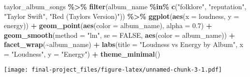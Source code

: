 \documentclass[
]{article}
\newenvironment{Shaded}{\begin{snugshade}}{\end{snugshade}}
\newcommand{\AttributeTok}[1]{\textcolor[rgb]{0.13,0.29,0.53}{#1}}
\newcommand{\CommentTok}[1]{\textcolor[rgb]{0.56,0.35,0.01}{\textit{#1}}}
\newcommand{\ConstantTok}[1]{\textcolor[rgb]{0.56,0.35,0.01}{#1}}
\newcommand{\DecValTok}[1]{\textcolor[rgb]{0.00,0.00,0.81}{#1}}
\newcommand{\FloatTok}[1]{\textcolor[rgb]{0.00,0.00,0.81}{#1}}
\newcommand{\FunctionTok}[1]{\textcolor[rgb]{0.13,0.29,0.53}{\textbf{#1}}}
\newcommand{\NormalTok}[1]{#1}
\newcommand{\OtherTok}[1]{\textcolor[rgb]{0.56,0.35,0.01}{#1}}
\newcommand{\SpecialCharTok}[1]{\textcolor[rgb]{0.81,0.36,0.00}{\textbf{#1}}}
\newcommand{\StringTok}[1]{\textcolor[rgb]{0.31,0.60,0.02}{#1}}
\begin{document}
\begin{Shaded}
\begin{Highlighting}[]
\NormalTok{taylor\_album\_songs }\SpecialCharTok{\%\textgreater{}\%}
  \FunctionTok{filter}\NormalTok{(album\_name }\SpecialCharTok{\%in\%} \FunctionTok{c}\NormalTok{(}\StringTok{"folklore"}\NormalTok{, }\StringTok{"reputation"}\NormalTok{, }\StringTok{"Taylor Swift"}\NormalTok{, }\StringTok{"Red (Taylor\textquotesingle{}s Version)"}\NormalTok{)) }\SpecialCharTok{\%\textgreater{}\%}
  \FunctionTok{ggplot}\NormalTok{(}\FunctionTok{aes}\NormalTok{(}\AttributeTok{x =}\NormalTok{ loudness, }\AttributeTok{y =}\NormalTok{ energy)) }\SpecialCharTok{+}
    \FunctionTok{geom\_point}\NormalTok{(}\FunctionTok{aes}\NormalTok{(}\AttributeTok{color =}\NormalTok{ album\_name), }\AttributeTok{alpha =} \FloatTok{0.7}\NormalTok{) }\SpecialCharTok{+}  
    \FunctionTok{geom\_smooth}\NormalTok{(}\AttributeTok{method =} \StringTok{"lm"}\NormalTok{, }\AttributeTok{se =} \ConstantTok{FALSE}\NormalTok{, }\FunctionTok{aes}\NormalTok{(}\AttributeTok{color =}\NormalTok{ album\_name)) }\SpecialCharTok{+}  
    \FunctionTok{facet\_wrap}\NormalTok{(}\SpecialCharTok{\textasciitilde{}}\NormalTok{album\_name) }\SpecialCharTok{+} 
    \FunctionTok{labs}\NormalTok{(}\AttributeTok{title =} \StringTok{"Loudness vs Energy by Album"}\NormalTok{, }\AttributeTok{x =} \StringTok{"Loudness"}\NormalTok{, }\AttributeTok{y =} \StringTok{"Energy"}\NormalTok{) }\SpecialCharTok{+}
  \FunctionTok{theme\_minimal}\NormalTok{() }
\end{Highlighting}
\end{Shaded}

\texttt{[image: final-project\_files/figure-latex/unnamed-chunk-3-1.pdf]}

\begin{Shaded}
\end{Shaded}
\end{document}
